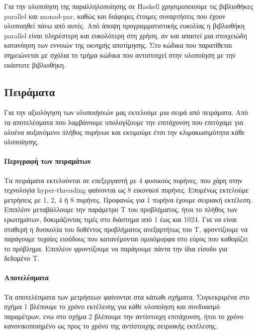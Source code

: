 \documentclass[titlepage]{article}
\begin{document}
Για την υλοποίηση της παραλληλοποίησης σε Haskell χρησιμοποιούμε τις βιβλιοθήκες parallel και monad-par, καθώς και διάφορες έτοιμες συναρτήσεις που έχουν υλοποιηθεί πάνω από αυτές. Από άποψη προγραμματιστικής ευκολίας η βιβλιοθήκη parallel είναι πληρέστερη και ευκολότερη στη χρήση, αν και απαιτεί μια στοιχειώδη κατανόηση των εννοιών της οκνηρής αποτίμησης. Στο κώδικα που παρατίθεται σημειώνεται με σχόλια το τμήμα κώδικα που αντιστοιχεί στην υλοποίηση με την εκάστοτε βιβλιοθήκη.

\subsection*{Πειράματα}

Για την αξιολόγηση των υλοποιήσεών μας εκτελούμε μια σειρά από πειράματα. Από τα αποτελέσματα που λαμβάνουμε υπολογίζουμε την επιτάχυνση που επιτύχαμε για ολοένα αυξανόμενο πλήθος πυρήνων και εκτιμούμε έτσι την κλιμακωσιμότητα κάθε υλοποίησης.

\paragraph{Περιγραφή των πειραμάτων}

Τα πειράματα εκτελούνται σε επεξεργαστή με 4 φυσικούς πυρήνες, που χάρη στην τεχνολογία hyper-threading φαίνονται ως 8 εικονικοί πυρήνες. Επομένως εκτελούμε μετρήσεις με 1, 2, 4 ή 8 πυρήνες. Προφανώς για 1 πυρήνα έχουμε σειριακή εκτέλεση. Επιπλέον μεταβάλλουμε την παράμετρο T του προβλήματος, ήτοι το πλήθος των ερωτημάτων, δοκιμάζοντας τιμές στο διάστημα από 1 έως και 1024. Για να είναι σταθερή η δυσκολία του δοθέντος προβλήματος ανεξαρτήτως του T, φροντίζουμε να παράγουμε τυχαίες εισόδους που κατανέμονται ομοιόμορφα στο εύρος που καθορίζει το πρόβλημα. Επιπλέον φροντίζουμε να παράγουμε πάντα την ίδια είσοδο για δεδομένο T.

\paragraph{Αποτελέσματα}

Τα αποτελέσματα των μετρήσεων φαίνονται στα κάτωθι σχήματα. Συγκεκριμένα στο σχήμα 1 βλέπουμε το χρόνο εκτέλεσης για κάθε υλοποίηση και συνδυασμό παραμέτρων, ενω στο σχήμα 2 βλέπουμε την αντίστοιχη επιτάχυνση, ήτοι το χρόνο κανονικοποιημένο ως προς το χρόνο της αντίστοιχης σειριακής εκτέλεσης.
\end{document}
